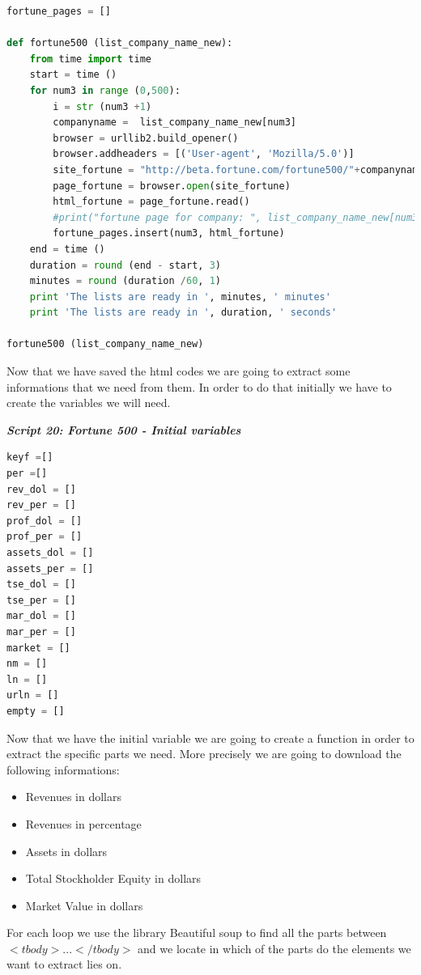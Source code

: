 \documentclass{article}
\begin{document}
\begin{lstlisting}[language=Python] 
fortune_pages = []

def fortune500 (list_company_name_new):
    from time import time  
    start = time ()
    for num3 in range (0,500):
        i = str (num3 +1)    
        companyname =  list_company_name_new[num3]
        browser = urllib2.build_opener() 
        browser.addheaders = [('User-agent', 'Mozilla/5.0')]
        site_fortune = "http://beta.fortune.com/fortune500/"+companyname+"-"+ i    
        page_fortune = browser.open(site_fortune)
        html_fortune = page_fortune.read()    
        #print("fortune page for company: ", list_company_name_new[num3],i)
        fortune_pages.insert(num3, html_fortune)
    end = time ()
    duration = round (end - start, 3)
    minutes = round (duration /60, 1)
    print 'The lists are ready in ', minutes, ' minutes'
    print 'The lists are ready in ', duration, ' seconds'

fortune500 (list_company_name_new)
\end{lstlisting}    
Now that we have saved the html codes we are going to extract some informations that we need from them. In order to do that initially we have to create the variables we will need.
\begin{center}
\textit{\textbf{Script 20: Fortune 500 - Initial variables}}
\end{center}
\begin{lstlisting}[language=Python] 
keyf =[]
per =[]
rev_dol = []
rev_per = []
prof_dol = []
prof_per = []
assets_dol = []
assets_per = []
tse_dol = []
tse_per = []
mar_dol = []
mar_per = []
market = []
nm = []
ln = []
urln = []
empty = []
\end{lstlisting}    
Now that we have the initial variable we are going to create a function in order to extract the specific parts we need. More precisely we are going to download the following informations:
\begin{itemize}
\item Revenues in dollars
\item Revenues in percentage
\item Assets in dollars
\item Total Stockholder Equity in dollars
\item Market Value in dollars
\end{itemize}
For each loop we use the library Beautiful soup to find all the parts between $<tbody>...</tbody>$ and we locate in which of the parts do the elements we want to extract lies on.\\
\end{document}
